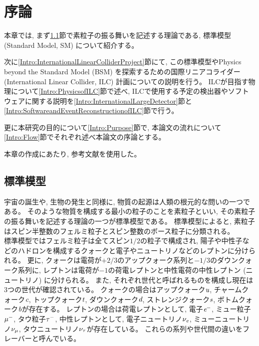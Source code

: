 
\chapter{序論} \label{chap:Introduction}

本章では, まず\ref{Intro:StandardModel}節で素粒子の振る舞いを記述する理論である, 標準模型 (Standard Model, SM) について紹介する。

次に\ref{Intro:InternationalLinearColliderProject}節にて, この標準模型やPhysics beyond the Standard Model (BSM) を探索するための国際リニアコライダー (International Linear Collider, ILC) 計画についての説明を行う。
ILCが目指す物理について\ref{Intro:PhysicsofILC}節で述べ, ILCで使用する予定の検出器やソフトウェアに関する説明を\ref{Intro:InternationalLargeDetector}節と\ref{Intro:SoftwareandEventReconstructionofILC}節で行う。

更に本研究の目的について\ref{Intro:Purpose}節で, 本論文の流れについて\ref{Intro:Flow}節でそれぞれ述べ本論文の序論とする。

本章の作成にあたり, 参考文献\cite{GlobalProject, InterimDesignReport}を使用した。


\section{標準模型} \label{Intro:StandardModel}

宇宙の誕生や, 生物の発生と同様に, 物質の起源は人類の根元的な問いの一つである。
そのような物質を構成する最小の粒子のことを素粒子といい, その素粒子の振る舞いを記述する理論の一つが標準模型である。
標準模型によると, 素粒子はスピン半整数のフェルミ粒子とスピン整数のボース粒子に分類される。\\

標準模型ではフェルミ粒子は全てスピン$1/2$の粒子で構成され, 陽子や中性子などのハドロンを構成するクォークと電子やニュートリノなどのレプトンに分けられる。
更に, クォークは電荷が$+2/3$のアップクォーク系列と$-1/3$のダウンクォーク系列に, レプトンは電荷が$-1$の荷電レプトンと中性電荷の中性レプトン (ニュートリノ) に分けられる。
また, それぞれ世代と呼ばれるものを構成し現在は3つの世代が確認されている。
クォークの場合はアップクォーク$\textit u$, チャームクォーク$\textit c$, トップクォーク$\textit t$, ダウンクォーク$\textit d$, ストレンジクォーク$\textit s$, ボトムクォーク$\textit b$が存在する。
レプトンの場合は荷電レプトンとして, 電子$\textit e^-$, ミュー粒子$\it \mu^-$, タウ粒子$\it \tau^-$, 中性レプトンとして, 電子ニュートリノ$\it \nu_e$, ミューニュートリノ$\it \nu_{\mu}$, タウニュートリノ$\it \nu_{\tau}$が存在している。
これらの系列や世代間の違いをフレーバーと呼んでいる。

